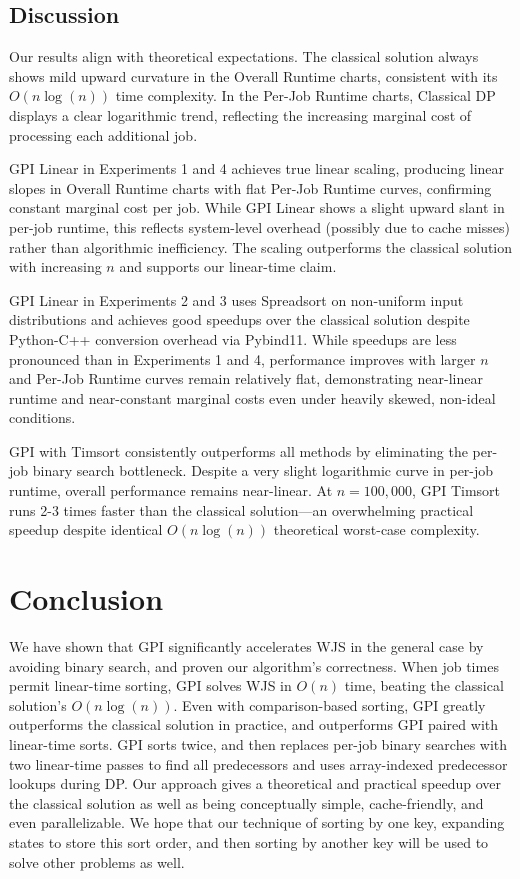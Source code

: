 \documentclass[final,5p,times]{elsarticle}
\begin{document}
\subsection{Discussion}

Our results align with theoretical expectations. The classical solution always shows mild upward curvature in the Overall Runtime charts, consistent with its $O(n \log(n))$ time complexity. In the Per-Job Runtime charts, Classical DP displays a clear logarithmic trend, reflecting the increasing marginal cost of processing each additional job.

GPI Linear in Experiments 1 and 4 achieves true linear scaling, producing linear slopes in Overall Runtime charts with flat Per-Job Runtime curves, confirming constant marginal cost per job. While GPI Linear shows a slight upward slant in per-job runtime, this reflects system-level overhead (possibly due to cache misses) rather than algorithmic inefficiency. The scaling outperforms the classical solution with increasing $n$ and supports our linear-time claim.

GPI Linear in Experiments 2 and 3 uses Spreadsort on non-uniform input distributions and achieves good speedups over the classical solution despite Python-C++ conversion overhead via Pybind11. While speedups are less pronounced than in Experiments 1 and 4, performance improves with larger $n$ and Per-Job Runtime curves remain relatively flat, demonstrating near-linear runtime and near-constant marginal costs even under heavily skewed, non-ideal conditions.

GPI with Timsort consistently outperforms all methods by eliminating the per-job binary search bottleneck. Despite a very slight logarithmic curve in per-job runtime, overall performance remains near-linear. At $n = 100{,}000$, GPI Timsort runs 2-3 times faster than the classical solution\thinspace—\thinspace an overwhelming practical speedup despite identical $O(n \log(n))$ theoretical worst-case complexity.

\section{Conclusion}
\label{sec:conclusion}

We have shown that GPI significantly accelerates WJS in the general case by avoiding binary search, and proven our algorithm's correctness. When job times permit linear-time sorting, GPI solves WJS in $O(n)$ time, beating the classical solution's $O(n \log(n))$. Even with comparison-based sorting, GPI greatly outperforms the classical solution in practice, and outperforms GPI paired with linear-time sorts. GPI sorts twice, and then replaces per-job binary searches with two linear-time passes to find all predecessors and uses array-indexed predecessor lookups during DP. Our approach gives a theoretical and practical speedup over the classical solution as well as being conceptually simple, cache-friendly, and even parallelizable. We hope that our technique of sorting by one key, expanding states to store this sort order, and then sorting by another key will be used to solve other problems as well.


\end{document}
